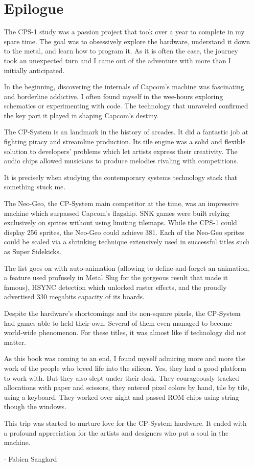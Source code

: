 \chapter{Epilogue} 

The CPS-1 study was a passion project that took over a year to complete in my spare time. The goal was to obsessively explore the hardware, understand it down to the metal, and learn how to program it. As it is often the case, the journey took an unexpected turn and I came out of the adventure with more than I initially anticipated.

In the beginning, discovering the internals of Capcom's machine was fascinating and borderline addictive. I often found myself in the wee-hours exploring schematics or experimenting with code. The technology that unraveled confirmed the key part it played in shaping Capcom's destiny. 

The CP-System is an landmark in the history of arcades. It did a fantastic job at fighting piracy and streamline production. Its tile engine was a solid and flexible solution to developers' problems which let artists express their creativity. The audio chips allowed musicians to produce melodies rivaling with competitions.

It is precisely when studying the contemporary systems technology stack that something stuck me. 

The Neo-Geo, the CP-System main competitor at the time, was an impressive machine which surpassed Capcom's flagship. SNK games were built relying exclusively on sprites without using limiting tilemaps. While the CPS-1 could display 256 sprites, the Neo-Geo could achieve 381. Each of the Neo-Geo sprites could be scaled via a shrinking technique extensively used in successful titles such as Super Sidekicks. 

The list goes on with auto-animation (allowing to define-and-forget an animation, a feature used profusely in Metal Slug for the gorgeous result that made it famous), HSYNC detection which unlocked raster effects, and the proudly advertised 330 megabits capacity of its boards.

Despite the hardware's shortcomings and its non-square pixels, the CP-System had games able to held their own. Several of them even managed to become world-wide phenomenon. For these titles, it was almost like if technology did not matter.

As this book was coming to an end, I found myself admiring more and more the work of the people who breed life into the silicon. Yes, they had a good platform to work with. But they also slept under their desk. They courageously tracked allocations with paper and scissors, they entered pixel colors by hand, tile by tile, using a keyboard. They worked over night and passed ROM chips using string though the windows. 

This trip was started to nurture love for the CP-System hardware. It ended with a profound appreciation for the artists and designers who put a soul in the machine.

- Fabien Sanglard
